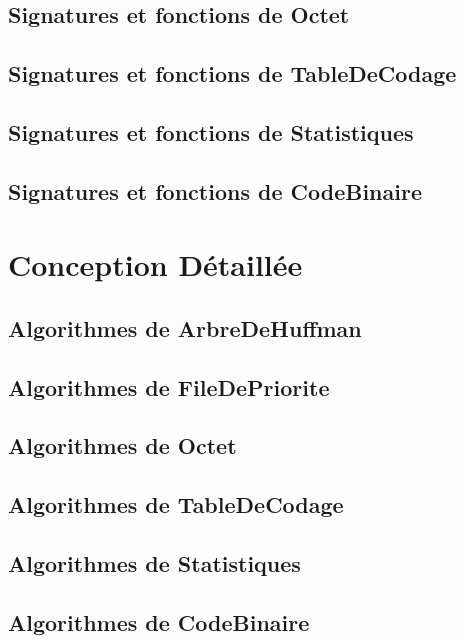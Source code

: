 \documentclass[10pt]{report}
\begin{document}
            \subsection{Signatures et fonctions de Octet}
            
            \subsection{Signatures et fonctions de TableDeCodage}
            
            \subsection{Signatures et fonctions de Statistiques}
            
            \subsection{Signatures et fonctions de CodeBinaire}
            
        \section{Conception Détaillée}
            \subsection{Algorithmes de ArbreDeHuffman}
            
            \subsection{Algorithmes de FileDePriorite}
            
            \subsection{Algorithmes de Octet}
            
            \subsection{Algorithmes de TableDeCodage}
            
            \subsection{Algorithmes de Statistiques}
            
            \subsection{Algorithmes de CodeBinaire}
            
\end{document}
